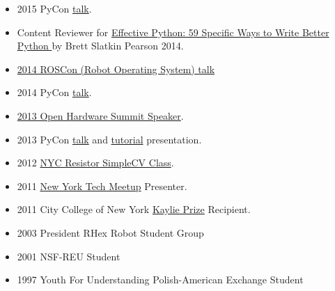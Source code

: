 \documentclass[10pt]{article}
\newenvironment{outerlist}[1][\enskip\textbullet]%
        {\begin{itemize}[#1]}{\end{itemize}%
         \vspace{-.6\baselineskip}}
\begin{document}
\begin{outerlist}
\item 2015 PyCon \href{https://www.youtube.com/watch?v=Wf0Uhebn2cM&ab_channel=PyCon2015}{talk}.
\item Content Reviewer for \href{http://smile.amazon.com/Effective-Python-Specific-Software-Development/dp/0134034287/ref=sr_1_1?ie=UTF8&qid=1453504025&sr=8-1&keywords=effective+python}{Effective Python: 59 Specific Ways to Write Better Python } by Brett Slatkin Pearson 2014.
\item \href{http://roscon.ros.org/2014/}{2014 ROSCon (Robot Operating System) talk}
\item 2014 PyCon \href{https://www.youtube.com/watch?v=grMfIoDgn9M&ab_channel=PyCon2014}{talk}.
\item \href{http://2013.oshwa.org/schedule/}{2013 Open Hardware Summit Speaker}.
\item 2013 PyCon \href{http://www.youtube.com/watch?v=UZSm7Q2bZoc&}{talk} and \href{http://www.youtube.com/watch?v=UZSm7Q2bZoc&}{tutorial} presentation.
\item 2012 \href{http://www.nycresistor.com/2012/02/29/tickets-still-available-for-this-amazing-new-class-this-sunday/}{NYC Resistor SimpleCV Class}.
\item 2011 \href{http://vimeo.com/28723189#t=4534}{New York Tech Meetup} Presenter.
\item 2011 City College of New York \href{http://entrepreneurship.ccny.cuny.edu/kaylieprize}{Kaylie Prize} Recipient.
\item 2003 President RHex Robot Student Group
\item 2001 NSF-REU Student
\item 1997 Youth For Understanding Polish-American Exchange Student
\end{outerlist}
\end{document}
